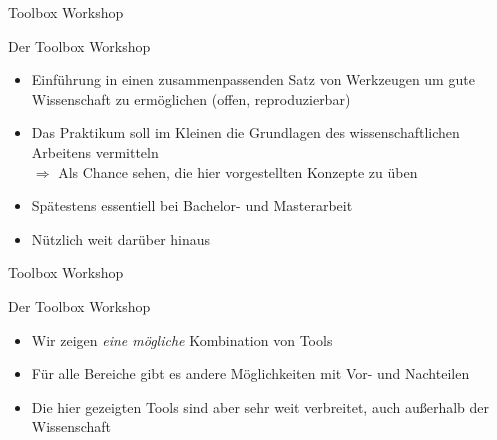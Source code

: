 \begin{frame}{Toolbox Workshop}
    \begin{center}
        \textcolor{vertexDarkRed}{\Huge Der Toolbox Workshop}\\[\baselineskip]
        \begin{itemize}
            \item Einführung in einen zusammenpassenden Satz von Werkzeugen um gute Wissenschaft zu ermöglichen
                (offen, reproduzierbar)
            \item Das Praktikum soll im Kleinen die Grundlagen des wissenschaftlichen Arbeitens vermitteln \\
                $\Rightarrow$ Als Chance sehen, die hier vorgestellten Konzepte zu üben
            \item Spätestens essentiell bei Bachelor- und Masterarbeit
            \item Nützlich weit darüber hinaus
        \end{itemize}
    \end{center}
\end{frame}

\begin{frame}{Toolbox Workshop}
    \begin{center}
        \textcolor{vertexDarkRed}{\Huge Der Toolbox Workshop}\\[\baselineskip]
        \begin{itemize}
            \item Wir zeigen \emph{eine mögliche} Kombination von Tools 
            \item Für alle Bereiche gibt es andere Möglichkeiten mit Vor- und Nachteilen
            \item Die hier gezeigten Tools sind aber sehr weit verbreitet, auch außerhalb der Wissenschaft
        \end{itemize}
    \end{center}
\end{frame}

